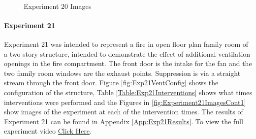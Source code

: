 \documentclass{article}
\begin{document}
\clearpage

\begin{figure}[H]
	\ContinuedFloat 
	\centering 
	 \ 
	\caption{Experiment 20 Images}
	\label{fig:Experiment20ImagesCont3} 
\end{figure}

\paragraph{Experiment 21}\mbox{}

Experiment 21 was intended to represent a fire in open floor plan family room of a two story structure, intended to demonstrate the effect of additional ventilation openings in the fire compartment. The front door is the intake for the fan and the two family room windows are the exhaust points. Suppression is via a straight stream through the front door. Figure \ref{fig:Exp21VentConfig} shows the configuration of the structure, Table \ref{Table:Exp21Interventions} shows what times interventions were performed and the Figures in \ref{fig:Experiment21ImagesCont1} show images of the experiment at each of the intervention times. The results of Experiment 21 can be found in Appendix \ref{App:Exp21Results}. To view the full experiment video \href{https://youtu.be/ykWOmLX9Xts}{Click Here}.
\end{document}
